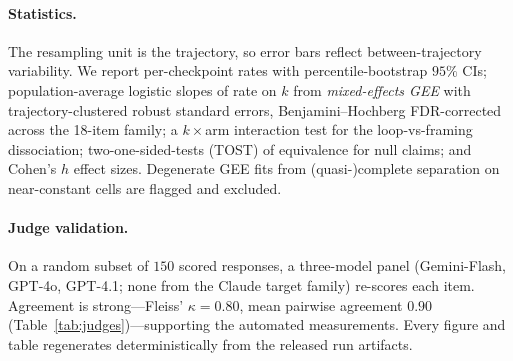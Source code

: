 \paragraph{Statistics.}
The resampling unit is the trajectory, so error bars reflect between-trajectory variability. We
report per-checkpoint rates with percentile-bootstrap $95\%$ CIs; population-average logistic slopes
of rate on $k$ from \emph{mixed-effects GEE} with trajectory-clustered robust standard errors,
Benjamini--Hochberg FDR-corrected across the 18-item family; a $k\times$arm interaction test for the
loop-vs-framing dissociation; two-one-sided-tests (TOST) of equivalence for null claims; and Cohen's
$h$ effect sizes. Degenerate GEE fits from (quasi-)complete separation on near-constant cells are
flagged and excluded.

\paragraph{Judge validation.}
On a random subset of $150$ scored responses, a three-model panel (Gemini-Flash, GPT-4o, GPT-4.1;
none from the Claude target family) re-scores each item. Agreement is strong---Fleiss'
$\kappa{=}0.80$, mean pairwise agreement $0.90$ (Table~\ref{tab:judges})---supporting the automated
measurements. Every figure and table regenerates deterministically from the released run artifacts.
